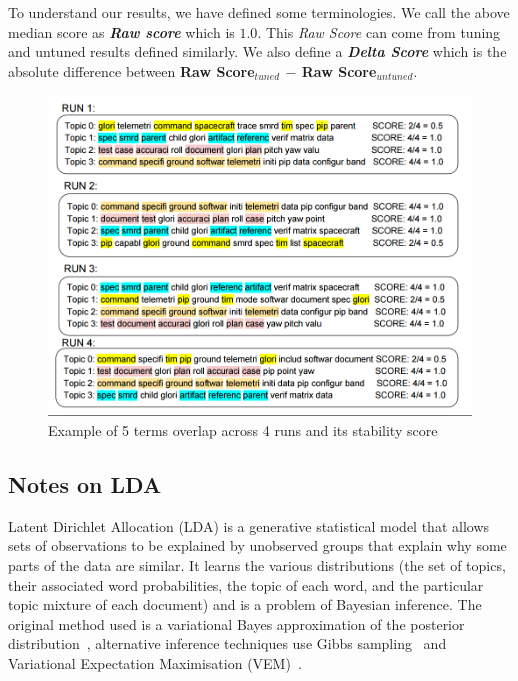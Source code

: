 \documentclass[conference]{IEEEtran}
\theoremstyle{break}
\begin{document}
To understand our results, we have defined some terminologies. We call the above median score as \textbf{\textit{Raw score}} which is $1.0$. This \textit{Raw Score} can come from tuning and untuned results defined similarly. We also define a \textbf{\textit{Delta Score}} which is the absolute difference between \textbf{Raw Score$_{tuned}$ $-$ Raw Score$_{untuned}$}.

\begin{figure}[!htpb]
  \captionsetup{justification=centering}
  \includegraphics[width=\linewidth]{./fig/jaccard.png}
  \caption{Example of 5 terms overlap across 4 runs and its stability score}
  \label{fig: jaccard}
\end{figure}

\subsection{Notes on LDA}
\label{sect: LDA}
Latent Dirichlet Allocation (LDA) is a generative statistical model that allows sets of observations to be explained by unobserved groups that explain why some parts of the data are similar. It learns the various distributions (the set of topics, their associated word probabilities, the topic of each word, and the particular topic mixture of each document) and is a problem of Bayesian inference. The original method used is a variational Bayes approximation of the posterior distribution~\cite{blei2003latent}, alternative inference techniques use Gibbs sampling~\cite{griffiths2004finding} and Variational Expectation Maximisation (VEM)~\cite{minka2002expectation}.
\end{document}
